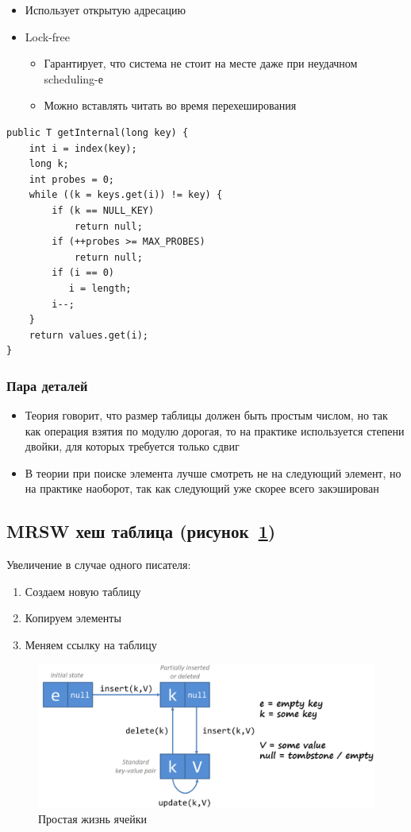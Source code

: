 \documentclass[10pt,a4paper,oneside,titlepage]{article}
\theoremstyle{plain}
\theoremstyle{defenition}
\begin{document}
\begin{itemize}
	\item Использует открытую адресацию
	\item Lock-free
	\begin{itemize}
		\item Гарантирует, что система не стоит на месте даже при неудачном scheduling-е
		\item Можно вставлять читать во время перехеширования
	\end{itemize}
\end{itemize}

\begin{lstlisting}
public T getInternal(long key) {
    int i = index(key);
    long k;
    int probes = 0;
    while ((k = keys.get(i)) != key) {
        if (k == NULL_KEY) 
            return null;
        if (++probes >= MAX_PROBES)
            return null;
        if (i == 0) 
           i = length;
        i--;
    }
    return values.get(i);
}
\end{lstlisting}

\subsubsection{Пара деталей}

\begin{itemize}
	\item Теория говорит, что размер таблицы должен быть простым числом, но так как операция взятия по модулю дорогая, то на практике используется степени двойки, для которых требуется только сдвиг
	\item В теории при поиске элемента лучше смотреть не на следующий элемент, но на практике наоборот, так как следующий уже скорее всего закэширован  
\end{itemize}

\subsection{MRSW хеш таблица (рисунок~\ref{fig:element1})}

Увеличение в случае одного писателя:
\begin{enumerate}
	\item Создаем новую таблицу
	\item Копируем элементы
	\item Меняем ссылку на таблицу
\end{enumerate}

\begin{figure}
	\centering
	\includegraphics[width=0.4\linewidth]{pictures/Element1}
	\caption{Простая жизнь ячейки}
	\label{fig:element1}
\end{figure}
\end{document}
